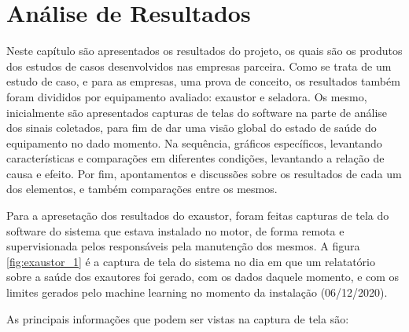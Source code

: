
\chapter{Análise de Resultados}

Neste capítulo são apresentados os resultados do projeto, os quais são os produtos dos estudos de casos desenvolvidos nas empresas parceira.
Como se trata de um estudo de caso, e para as empresas, uma prova de conceito, os resultados também foram divididos por equipamento avaliado:
exaustor e seladora. Os mesmo, inicialmente são apresentados capturas de telas do software na parte de análise dos sinais coletados, para fim
de dar uma visão global do estado de saúde do equipamento no dado momento. Na sequência, gráficos específicos, levantando características e 
comparações em diferentes condições, levantando a relação de causa e efeito. Por fim, apontamentos e discussões sobre os resultados de cada um
dos elementos, e também comparações entre os mesmos.

Para a apresetação dos resultados do exaustor, foram feitas capturas de tela do software do sistema que estava instalado no motor, de forma
remota e supervisionada pelos responsáveis pela manutenção dos mesmos. A figura \ref{fig:exaustor_1} é a captura de tela do sistema no dia
em que um relatatório sobre a saúde dos exautores foi gerado, com os dados daquele momento, e com os limites gerados pelo machine learning
no momento da instalação (06/12/2020).

As principais informações que podem ser vistas na captura de tela são: 

